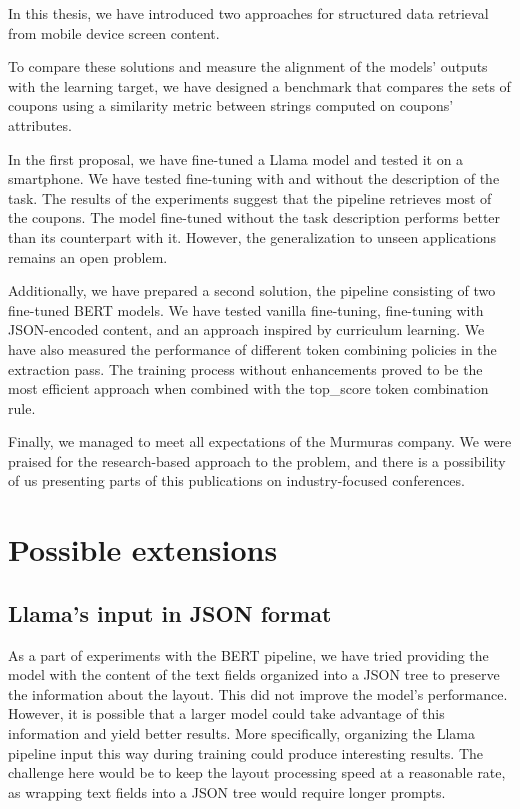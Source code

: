 \documentclass[licencjacka,en]{pracamgr}
\begin{document}
In this thesis, we have introduced two approaches for structured data retrieval from mobile device screen content.

To compare these solutions and measure the alignment of the models' outputs with the learning target, we have designed a benchmark that compares the sets of coupons using a similarity metric between strings computed on coupons' attributes.

In the first proposal, we have fine-tuned a Llama model and tested it on a smartphone. We have tested fine-tuning with and without the description of the task. The results of the experiments suggest that the pipeline retrieves most of the coupons. The model fine-tuned without the task description performs better than its counterpart with it. However, the generalization to unseen applications remains an open problem.

Additionally, we have prepared a second solution, the pipeline consisting of two fine-tuned BERT models. We have tested vanilla fine-tuning, fine-tuning with JSON-encoded content, and an approach inspired by curriculum learning. We have also measured the performance of different token combining policies in the extraction pass. The training process without enhancements proved to be the most efficient approach when combined with the top\_score token combination rule.

Finally, we managed to meet all expectations of the Murmuras company. We were praised for the research-based approach to the problem, and there is a possibility of us presenting parts of this publications on industry-focused conferences.

\section{Possible extensions}

\subsection{Llama's input in JSON format}

As a part of experiments with the BERT pipeline, we have tried providing the model with the content of the text fields organized into a JSON tree to preserve the information about the layout. This did not improve the model's performance. However, it is possible that a larger model could take advantage of this information and yield better results. More specifically, organizing the Llama pipeline input this way during training could produce interesting results. The challenge here would be to keep the layout processing speed at a reasonable rate, as wrapping text fields into a JSON tree would require longer prompts.
\end{document}
